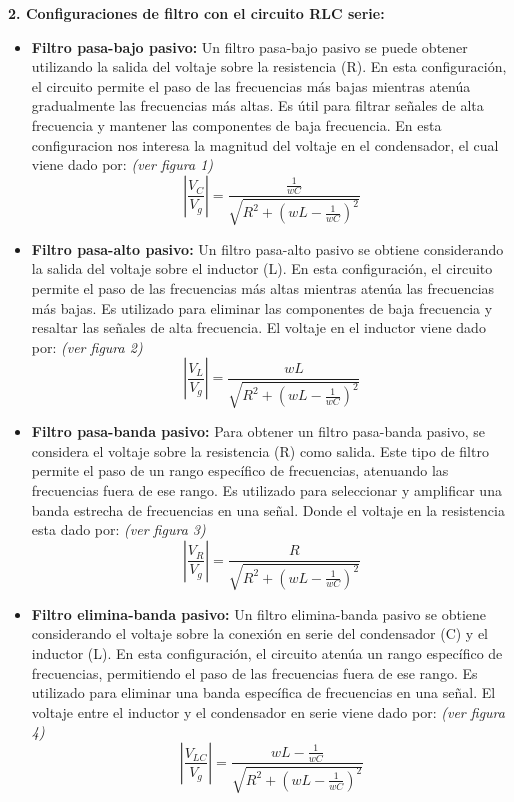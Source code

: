 \documentclass[12pt]{article}
\begin{document}
    \textbf{2. Configuraciones de filtro con el circuito RLC serie:}

    \begin{itemize}
        \item \textbf{Filtro pasa-bajo pasivo:} Un filtro pasa-bajo pasivo se puede obtener utilizando la salida del voltaje sobre la resistencia (R). En esta configuración, el circuito permite el paso de las frecuencias más bajas mientras atenúa gradualmente las frecuencias más altas. Es útil para filtrar señales de alta frecuencia y mantener las componentes de baja frecuencia. En esta configuracion nos interesa la magnitud del voltaje en el condensador, el cual viene dado por: \textit{(ver figura 1)} $$ \left| \frac{V_{C}}{V_{g}} \right| = \frac{\frac{1}{wC}}{\sqrt{R^2 + (wL - \frac{1}{wC})^2}}$$
    
        \item \textbf{Filtro pasa-alto pasivo:} Un filtro pasa-alto pasivo se obtiene considerando la salida del voltaje sobre el inductor (L). En esta configuración, el circuito permite el paso de las frecuencias más altas mientras atenúa las frecuencias más bajas. Es utilizado para eliminar las componentes de baja frecuencia y resaltar las señales de alta frecuencia. El voltaje en el inductor viene dado por: \textit{(ver figura 2)} $$ \left| \frac{V_{L}}{V_{g}} \right| = \frac{wL}{\sqrt{R^2 + (wL - \frac{1}{wC})^2}}$$
    
        \item \textbf{Filtro pasa-banda pasivo:} Para obtener un filtro pasa-banda pasivo, se considera el voltaje sobre la resistencia (R) como salida. Este tipo de filtro permite el paso de un rango específico de frecuencias, atenuando las frecuencias fuera de ese rango. Es utilizado para seleccionar y amplificar una banda estrecha de frecuencias en una señal. Donde el voltaje en la resistencia esta dado por: \textit{(ver figura 3)} $$\left| \frac{V_{R}}{V_{g}} \right|= \frac{R}{\sqrt{R^2 + (wL - \frac{1}{wC})^2}}$$
    
        \item \textbf{Filtro elimina-banda pasivo:} Un filtro elimina-banda pasivo se obtiene considerando el voltaje sobre la conexión en serie del condensador (C) y el inductor (L). En esta configuración, el circuito atenúa un rango específico de frecuencias, permitiendo el paso de las frecuencias fuera de ese rango. Es utilizado para eliminar una banda específica de frecuencias en una señal. El voltaje entre el inductor y el condensador en serie viene dado por: \textit{(ver figura 4)} $$\left| \frac{V_{LC}}{V_{g}} \right|= \frac{wL - \frac{1}{wC}}{\sqrt{R^2 + (wL - \frac{1}{wC})^2}}$$
    \end{itemize}
    
\end{document}
